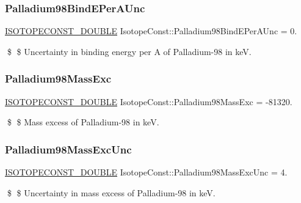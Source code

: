 \subsubsection{\texorpdfstring{Palladium98\+Bind\+E\+Per\+A\+Unc}{Palladium98BindEPerAUnc}}
{\footnotesize\ttfamily \mbox{\hyperlink{group___isotope_const-_macros_ga8f45a7272ce02c0b4c65c44636ed719a}{I\+S\+O\+T\+O\+P\+E\+C\+O\+N\+S\+T\+\_\+\+D\+O\+U\+B\+LE}} Isotope\+Const\+::\+Palladium98\+Bind\+E\+Per\+A\+Unc = 0.}

\$ \$ Uncertainty in binding energy per A of Palladium-\/98 in keV. \mbox{\label{group___isotope_const-_palladium-_pd98_ga06031ef6b580f1cc760df510068f5b30}} 
\subsubsection{\texorpdfstring{Palladium98\+Mass\+Exc}{Palladium98MassExc}}
{\footnotesize\ttfamily \mbox{\hyperlink{group___isotope_const-_macros_ga8f45a7272ce02c0b4c65c44636ed719a}{I\+S\+O\+T\+O\+P\+E\+C\+O\+N\+S\+T\+\_\+\+D\+O\+U\+B\+LE}} Isotope\+Const\+::\+Palladium98\+Mass\+Exc = -\/81320.}

\$ \$ Mass excess of Palladium-\/98 in keV. \mbox{\label{group___isotope_const-_palladium-_pd98_ga95c08741ac60216d4d2558cc27c761b6}} 
\subsubsection{\texorpdfstring{Palladium98\+Mass\+Exc\+Unc}{Palladium98MassExcUnc}}
{\footnotesize\ttfamily \mbox{\hyperlink{group___isotope_const-_macros_ga8f45a7272ce02c0b4c65c44636ed719a}{I\+S\+O\+T\+O\+P\+E\+C\+O\+N\+S\+T\+\_\+\+D\+O\+U\+B\+LE}} Isotope\+Const\+::\+Palladium98\+Mass\+Exc\+Unc = 4.}

\$ \$ Uncertainty in mass excess of Palladium-\/98 in keV. \mbox{\label{group___isotope_const-_palladium-_pd98_gae478dfebadc5bc7a92f364ad1653642c}} 
